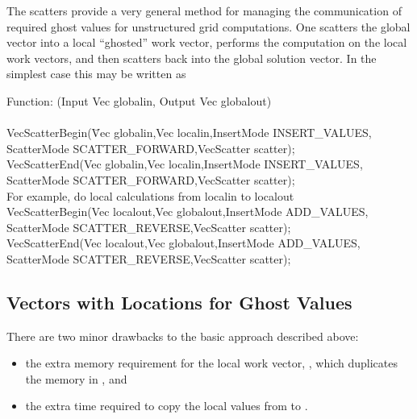 The scatters provide a very general method for managing the communication of 
required ghost values for unstructured grid computations. One scatters
the global vector into a local ``ghosted'' work vector, performs the computation
on the local work vectors, and then scatters back into the global solution 
vector. In the simplest case this may be written as
\begin{tabbing}
   Function: (Input Vec globalin, Output Vec globalout)\\
\\
  VecScatterBegin(\=Vec globalin,Vec localin,InsertMode INSERT\_VALUES,\\
                 \>         ScatterMode SCATTER\_FORWARD,VecScatter scatter);\\
  VecScatterEnd(Vec globalin,Vec localin,InsertMode INSERT\_VALUES,\\
                 \>       ScatterMode SCATTER\_FORWARD,VecScatter scatter);\\
  \trl{/*} For example, do local calculations from localin to localout \trl{*/} \\
  VecScatterBegin(Vec localout,Vec globalout,InsertMode ADD\_VALUES,\\
                 \>         ScatterMode SCATTER\_REVERSE,VecScatter scatter);\\
  VecScatterEnd(Vec localout,Vec globalout,InsertMode ADD\_VALUES,\\
                 \>       ScatterMode SCATTER\_REVERSE,VecScatter scatter);
\end{tabbing}

\subsection{Vectors with Locations for Ghost Values}


There are two minor drawbacks to the basic approach described above:
\begin{itemize}
\item the extra memory requirement for the local work vector, , which
      duplicates the memory in , and
\item the extra time required to copy the local values from  to 
      .
\end{itemize}

